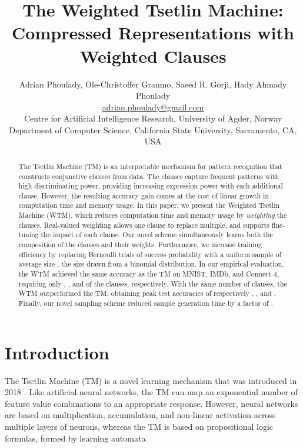 \documentclass[letterpaper]{article}
\begin{document}
\title{The Weighted Tsetlin Machine:\\Compressed Representations with Weighted Clauses}
\author{Adrian Phoulady, Ole-Christoffer Granmo, Saeed R. Gorji, Hady Ahmady Phoulady\\
        \small \href{mailto:adrian.phoulady@gmail.com}{adrian.phoulady@gmail.com}\\
        \small Centre for Artificial Intelligence Research, University of Agder, Norway\\
        \small Department of Computer Science, California State University, Sacramento, CA, USA}
\nocopyright
\maketitle
\begin{abstract}
The Tsetlin Machine (TM) is an interpretable mechanism for pattern recognition that constructs conjunctive clauses from data. The clauses capture frequent patterns with high discriminating power, providing increasing expression power with each additional clause. However, the resulting accuracy gain comes at the cost of linear growth in computation time and memory usage. In this paper, we present the Weighted Tsetlin Machine (WTM), which reduces computation time and memory usage by \emph{weighting} the clauses. Real-valued weighting allows one clause to replace multiple, and supports fine-tuning the impact of each clause. Our novel scheme simultaneously learns both the composition of the clauses and their weights. Furthermore, we increase training efficiency by replacing  Bernoulli trials of success probability  with a uniform sample of average size , the size drawn from a binomial distribution. In our empirical evaluation, the WTM achieved the same accuracy as the TM on MNIST, IMDb, and Connect-4, requiring only , , and  of the clauses, respectively. With the same number of clauses, the WTM outperformed the TM, obtaining peak test accuracies of respectively , , and . Finally, our novel sampling scheme reduced sample generation time by a factor of .
\end{abstract}

\maketitle
{}
\section{Introduction}
The Tsetlin Machine (TM) is a novel learning mechanism that was introduced in 2018 \cite{granmo2018tsetlin}. Like artificial neural networks, the TM can map an exponential number of feature value combinations to an appropriate response. However, neural networks are based on multiplication, accumulation, and non-linear activation across multiple layers of neurons, whereas the TM is based on propositional logic formulas, formed by learning automata. 
\end{document}
